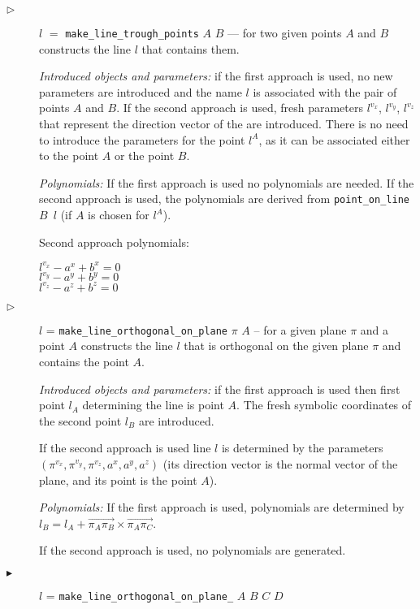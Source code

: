 \documentclass{article}
\begin{document}
\begin{description}
\item[$\triangleright$] $l$ $=$ {\tt make\_line\_trough\_points} $A$
  $B$ --- for two given points $A$ and $B$ constructs the line $l$
  that contains them.

  {\em Introduced objects and parameters:} if the first approach is
  used, no new parameters are introduced and the name $l$ is
  associated with the pair of points $A$ and $B$. If the second
  approach is used, fresh parameters $l^{v_x}$, $l^{v_y}$, $l^{v_z}$
  that represent the direction vector of the are introduced. There is
  no need to introduce the parameters for the point $l^A$, as it can
  be associated either to the point $A$ or the point $B$.

  {\em Polynomials:} If the first approach is used no polynomials are
  needed. If the second approach is used, the polynomials are derived
  from {\tt point\_on\_line $B$ $l$} (if $A$ is chosen for $l^A$).

Second approach polynomials:
\begin{tabbing}
$l^{v_x} - a^x + b^x = 0$ \\
$l^{v_y} - a^y + b^y = 0$ \\
$l^{v_z} - a^z + b^z = 0$
\end{tabbing}

\item[$\triangleright$] $l$ = {\tt make\_line\_orthogonal\_on\_plane}
  $\pi$ $A$ -- for a given plane $\pi$ and a point $A$ constructs the
  line $l$ that is orthogonal on the given plane $\pi$ and contains
  the point $A$.

  {\em Introduced objects and parameters:} if the first approach is
  used then first point $l_A$ determining the line is point $A$. The
  fresh symbolic coordinates of the second point $l_B$ are introduced.

  If the second approach is used line $l$ is determined by the
  parameters $(\pi^{v_x}, \pi^{v_y}, \pi^{v_z}, a^x, a^y, a^z)$ (its
  direction vector is the normal vector of the plane, and its point is
  the point $A$).

  {\em Polynomials:} If the first approach is used, polynomials are
  determined by
  $l_B = l_A + \overrightarrow{\pi_A\pi_B} \times
  \overrightarrow{\pi_A\pi_C}$.

  If the second approach is used, no polynomials are generated.

\item[$\blacktriangleright$] $l$ = {\tt make\_line\_orthogonal\_on\_plane\_} $A$ $B$ $C$ $D$\\


\end{description}
\end{document}
